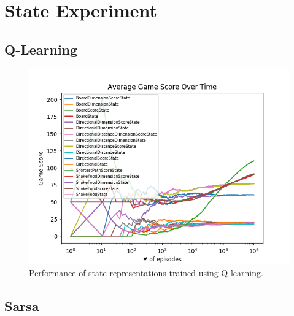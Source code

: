 \documentclass[result.tex]{subfiles}
\begin{document}
    \clearpage
    \appendix

    \section{State Experiment}

    \subsection*{Q-Learning}

    \begin{figure}[ht]
        \centering
        \includegraphics[width=\linewidth]{../images/qlearning/state/234/all_average_game_score_over_time.png}
        \caption{Performance of state representations trained using Q-learning.}
        \label{fig:app_state_qlearning}
    \end{figure}

    \newpage

    \subsection*{Sarsa}
\end{document}
